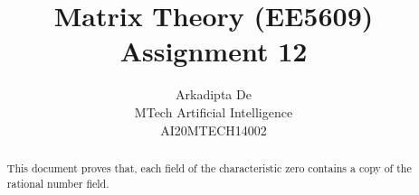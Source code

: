 \documentclass[journal,12pt,twocolumn]{IEEEtran}
\DeclareMathOperator*{\Res}{Res}
\begin{document}
\providecommand{\abs}[1]{\left\vert#1\right\vert}
\providecommand{\res}[1]{\Res\displaylimits_{#1}} 
\providecommand{\norm}[1]{\left\lVert#1\right\rVert}
\providecommand{\mtx}[1]{\mathbf{#1}}
\providecommand{\mean}[1]{E\left[ #1 \right]}
\providecommand{\fourier}{\overset{\mathcal{F}}{ \rightleftharpoons}}
\providecommand{\system}{\overset{\mathcal{H}}{ \longleftrightarrow}}
\newcommand{\solution}{\noindent \textbf{Solution: }}
\newcommand{\cosec}{\,\text{cosec}\,}
\providecommand{\dec}[2]{\ensuremath{\overset{#1}{\underset{#2}{\gtrless}}}}
\newcommand{\myvec}[1]{\ensuremath{\begin{pmatrix}#1\end{pmatrix}}}
\newcommand{\mydet}[1]{\ensuremath{\begin{vmatrix}#1\end{vmatrix}}}
\makeatletter
{}
\makeatother
\let\StandardTheFigure\thefigure
\let\vec\mathbf
\renewcommand{\thefigure}{\theproblem}
\def\putbox#1#2#3{\makebox[0in][l]{\makebox[#1][l]{}\raisebox{\baselineskip}[0in][0in]{\raisebox{#2}[0in][0in]{#3}}}}
     \def\rightbox#1{\makebox[0in][r]{#1}}
     \def\centbox#1{\makebox[0in]{#1}}
     \def\topbox#1{\raisebox{-\baselineskip}[0in][0in]{#1}}
     \def\midbox#1{\raisebox{-0.5\baselineskip}[0in][0in]{#1}}
\vspace{3cm}
\title{Matrix Theory (EE5609) Assignment 12}
\author{Arkadipta De\\MTech Artificial Intelligence\\AI20MTECH14002}

\maketitle
\newpage
\bigskip
\renewcommand{\thefigure}{\theenumi}
\renewcommand{\thetable}{\theenumi}

\begin{abstract}
This document proves that, each field of the characteristic zero contains a copy of the rational number field.
\end{abstract}
\end{document}
